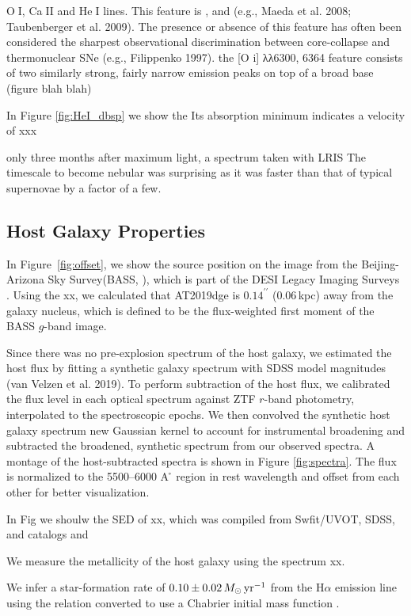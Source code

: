 \documentclass[twocolumn]{aastex63}
\def\ion#1#2{#1$\;${\footnotesize\rm{#2}}\relax}
\begin{document}
\begin{CJK*}{UTF8}{gbsn}
\ion{O}{I}, \ion{Ca}{II} and \ion{He}{I} lines. 
This feature is , and  (e.g., Maeda et al. 2008; Taubenberger et al. 
2009). The presence or absence of this feature has often been considered the sharpest observational 
discrimination between core-collapse and thermonuclear SNe (e.g., Filippenko 1997). 
the [O i] λλ6300, 6364 feature consists of two similarly strong, fairly narrow emission peaks on top of 
a broad base (figure blah blah)

In Figure \ref{fig:HeI_dbsp} we show the 
Its absorption minimum indicates a velocity of xxx

only three months after maximum light, a spectrum taken with LRIS
The timescale to become nebular was surprising as it was faster than that of typical supernovae by a 
factor of a few.

\subsection{Host Galaxy Properties}
In Figure~\ref{fig:offset}, we show the source position on the image from the Beijing-Arizona Sky 
Survey(BASS, \citealt{Zou2017}), which is part of the DESI Legacy Imaging Surveys \citep{Dey2019}. 
Using the xx, we calculated 
that AT2019dge is $0.14^{\prime\prime}$ (0.06\,kpc) away from the galaxy nucleus, which is defined to 
be the flux-weighted first 
moment of the BASS $g$-band image.

Since there was no pre-explosion spectrum of the host galaxy, we estimated the host flux 
by fitting a synthetic galaxy spectrum with SDSS model magnitudes (van Velzen et al. 2019). To 
perform subtraction of the host flux, we calibrated the flux level in each optical spectrum against ZTF 
$r$-band photometry, interpolated to the spectroscopic epochs. We then convolved the synthetic 
host galaxy spectrum new
Gaussian kernel to account for instrumental broadening and subtracted 
the broadened, synthetic spectrum from our observed spectra. A montage of the host-subtracted 
spectra is shown in Figure \ref{fig:spectra}. The flux is normalized to the 5500–6000 A ̊ region in rest 
wavelength and offset from each other for better visualization.

In Fig we shoulw the SED of xx, which was compiled from Swfit/UVOT, SDSS, and catalogs and 

We measure the metallicity of the host galaxy using  the spectrum xx. 

We infer a star-formation rate of $0.10 \pm 0.02 \, M_\odot\, {\rm yr^{-1}}$ from the H$\alpha$ 
emission line using the \citet{Kennicutt1998} relation converted to use a Chabrier initial mass function 
\citep{Chabrier2003, Madau2014}. 


\end{CJK*}
\end{document}
